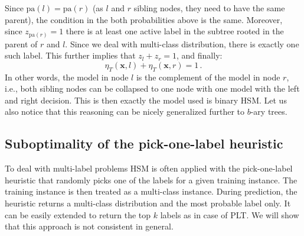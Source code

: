 \documentclass{article}
\renewcommand{\vec}[1]{\boldsymbol{#1}}
\newcommand{\bx}{\vec{x}}
\newcommand{\heta}{\hat{\eta}}
\newcommand{\pa}[1]{\mathrm{pa}(#1)}
\newcommand{\prob}{\mathbf{P}}
\newcommand{\sectionBefore}{-0pt}
\newcommand{\sectionAfter}{-0pt}
\begin{document}
Since $\pa{l} = \pa{r}$ (as $l$ and $r$ sibling nodes, they need to have the same parent), the condition in the both probabilities above is the same. Moreover, since $z_{\pa{r}} =1$ there is at least one active label in the subtree rooted in the parent of $r$ and $l$. Since we deal with multi-class distribution, there is exactly one such label. This further implies that $z_l + z_r = 1$, and finally: 
\begin{equation}
\eta_T(\bx, l)+ \eta_T(\bx, r) = 1 \,.
\label{eqn:sibling_summation}
\end{equation}
In other words, the model in node $l$ is the complement of the model in node $r$, i.e., both sibling nodes can be collapsed to one node with one model with the left and right decision. This is then exactly the model used is binary HSM. Let us also notice that this reasoning can be nicely generalized further to $b$-ary trees.


\vspace{\sectionBefore}
\subsection{Suboptimality of the pick-one-label heuristic}
\label{sec:online_PLTs}
\vspace{\sectionAfter}

To deal with multi-label problems HSM is often applied with the pick-one-label heuristic that randomly picks one of the labels for a given training instance. The training instance is then treated as a multi-class instance. During prediction, the heuristic returns a multi-class distribution and the most probable label only. It can be easily extended to return the top $k$ labels as in case of PLT. We will show that this approach is not consistent in general. 

\end{document}
